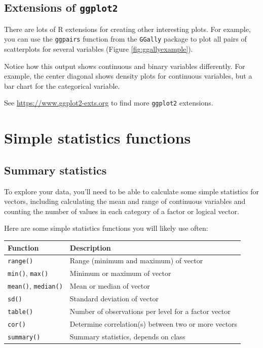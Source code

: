 \documentclass[]{book}
\makeatletter
\newenvironment{Shaded}{\begin{snugshade}}{\end{snugshade}}
\newcommand{\KeywordTok}[1]{\textcolor[rgb]{0.13,0.29,0.53}{\textbf{#1}}}
\newcommand{\StringTok}[1]{\textcolor[rgb]{0.31,0.60,0.02}{#1}}
\newcommand{\OperatorTok}[1]{\textcolor[rgb]{0.81,0.36,0.00}{\textbf{#1}}}
\newcommand{\NormalTok}[1]{#1}
\newenvironment{kframe}{%
\medskip{}
\setlength{\fboxsep}{.8em}
 \def\at@end@of@kframe{}%
 \ifinner\ifhmode%
  \def\at@end@of@kframe{\end{minipage}}%
  \begin{minipage}{\columnwidth}%
 \fi\fi%
 \def\FrameCommand##1{\hskip\@totalleftmargin \hskip-\fboxsep
 \colorbox{shadecolor}{##1}\hskip-\fboxsep
     \hskip-\linewidth \hskip-\@totalleftmargin \hskip\columnwidth}%
 \MakeFramed {\advance\hsize-\width
   \@totalleftmargin\z@ \linewidth\hsize
   \@setminipage}}%
 {\par\unskip\endMakeFramed%
 \at@end@of@kframe}
\renewenvironment{Shaded}{\begin{kframe}}{\end{kframe}}
\theoremstyle{definition}
\theoremstyle{definition}
\theoremstyle{definition}
\theoremstyle{remark}
\makeatother
\begin{document}
\subsection{\texorpdfstring{Extensions of
\texttt{ggplot2}}{Extensions of ggplot2}}\label{extensions-of-ggplot2}

There are lots of R extensions for creating other interesting plots. For
example, you can use the \texttt{ggpairs} function from the
\texttt{GGally} package to plot all pairs of scatterplots for several
variables (Figure \ref{fig:ggallyexample}).

\begin{Shaded}
\end{Shaded}

Notice how this output shows continuous and binary variables
differently. For example, the center diagonal shows density plots for
continuous variables, but a bar chart for the categorical variable.

See \url{https://www.ggplot2-exts.org} to find more \texttt{ggplot2}
extensions.

\section{Simple statistics functions}\label{simple-statistics-functions}

\subsection{Summary statistics}\label{summary-statistics}

To explore your data, you'll need to be able to calculate some simple
statistics for vectors, including calculating the mean and range of
continuous variables and counting the number of values in each category
of a factor or logical vector.

Here are some simple statistics functions you will likely use often:

\begin{longtable}[]{@{}ll@{}}
\toprule
Function & Description\tabularnewline
\midrule
\endhead
\texttt{range()} & Range (minimum and maximum) of vector\tabularnewline
\texttt{min()}, \texttt{max()} & Minimum or maximum of
vector\tabularnewline
\texttt{mean()}, \texttt{median()} & Mean or median of
vector\tabularnewline
\texttt{sd()} & Standard deviation of vector\tabularnewline
\texttt{table()} & Number of observations per level for a factor
vector\tabularnewline
\texttt{cor()} & Determine correlation(s) between two or more
vectors\tabularnewline
\texttt{summary()} & Summary statistics, depends on class\tabularnewline
\bottomrule
\end{longtable}
\end{document}
